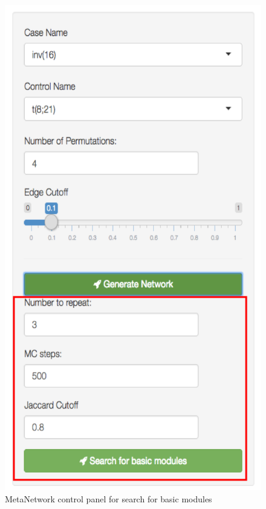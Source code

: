 \begin{steps}
\begin{figure}[H]
\begin{center}
\includegraphics[scale=0.35]{./figure/MetaNetwork/MetaNetworkstep2}
\caption{MetaNetwork control panel for search for basic modules}
\label{fig:MetaNetworkstep2}
\end{center}
\end{figure}


\end{steps}
